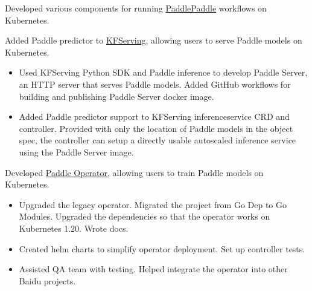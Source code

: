 
Developed various components for running \href{https://github.com/PaddlePaddle}{PaddlePaddle} workflows on Kubernetes.

\begin{miniItemize}
    \item Added Paddle predictor to \href{https://github.com/kubeflow/kfserving}{KFServing}, allowing users to serve Paddle models on Kubernetes.
    \begin{itemize}[after=\vspace{0ex}]
        \item Used KFServing Python SDK and Paddle inference to develop Paddle Server, an HTTP server that serves Paddle models. Added GitHub workflows for building and publishing Paddle Server docker image.
        \item Added Paddle predictor support to KFServing inferenceservice CRD and controller. Provided with only the location of Paddle models in the object spec, the controller can setup a directly usable autoscaled inference service using the Paddle Server image.
    \end{itemize}
    \item Developed \href{https://github.com/PaddleFlow/paddle-operator}{Paddle Operator}, allowing users to train Paddle models on Kubernetes.
    \begin{itemize}[after=\vspace{0ex}]
        \item Upgraded the legacy operator. Migrated the project from Go Dep to Go Modules. Upgraded the dependencies so that the operator works on Kubernetes 1.20. Wrote docs.
        \item Created helm charts to simplify operator deployment. Set up controller tests.
        \item Assisted QA team with testing. Helped integrate the operator into other Baidu projects.
    \end{itemize}
\end{miniItemize}
